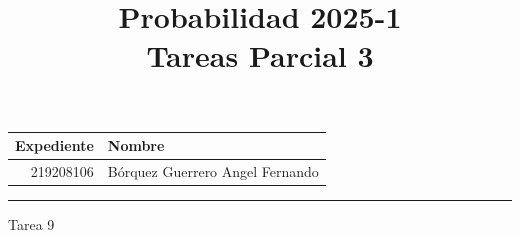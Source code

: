\documentclass[a4paper, 12pt]{article}
\title
{
    Probabilidad 2025-1 \\
    Tareas Parcial 3
    }
\begin{document}
    \maketitle

    \begin{center}
        \begin{tabular}{r|l}
            \textbf{Expediente} & \textbf{Nombre} \\ \hline
            219208106 & Bórquez Guerrero Angel Fernando \\
        \end{tabular}
    \end{center}

    \rule{\linewidth}{0.3mm}



    \vspace{0.3cm}

    \begin{center}
        { \LARGE Tarea 9}
    \end{center}
\end{document}

